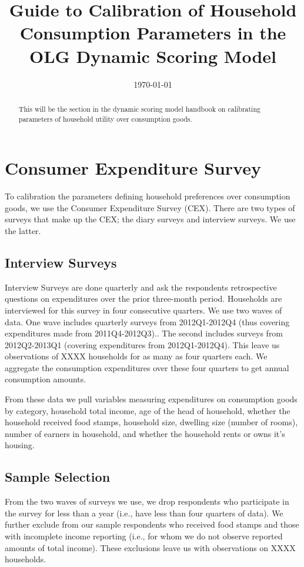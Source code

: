 \documentclass[article,11pt,letterpaper,fleqn]{article}
\title{Guide to Calibration of Household Consumption Parameters in the OLG Dynamic Scoring Model}
\date{\today}
\theoremstyle{definition}
\numberwithin{equation}{section}
\begin{document}

\maketitle



\begin{abstract}
This will be the section in the dynamic scoring model handbook on calibrating parameters of household utility over consumption goods.
\end{abstract}

\section{Consumer Expenditure Survey}

To calibration the parameters defining household preferences over consumption goods, we use the Consumer Expenditure Survey (CEX).  There are two types of surveys that make up the CEX; the diary surveys and interview surveys.  We use the latter.  

\subsection{Interview Surveys}

Interview Surveys are done quarterly and ask the respondents retrospective questions on expenditures over the prior three-month period.  Households are interviewed for this survey in four consecutive quarters.  We use two waves of data.  One wave includes quarterly surveys from 2012Q1-2012Q4 (thus covering expenditures made from 2011Q4-2012Q3).. The second includes surveys from 2012Q2-2013Q1 (covering expenditures from 2012Q1-2012Q4).  This leave us observations of XXXX households for as many as four quarters each.  We aggregate the consumption expenditures over these four quarters to get annual consumption amounts.

From these data we pull variables measuring expenditures on consumption goods by category, household total income, age of the head of household, whether the household received food stamps, household size, dwelling size (number of rooms), number of earners in household, and whether the household rents or owns it's housing.

\subsection{Sample Selection}

From the two waves of surveys we use, we drop respondents who participate in the survey for less than a year (i.e., have less than four quarters of data).  We further exclude from our sample respondents who received food stamps and those with incomplete income reporting (i.e., for whom we do not observe reported amounts of total income).  These exclusions leave us with observations on XXXX households.
\end{document}
